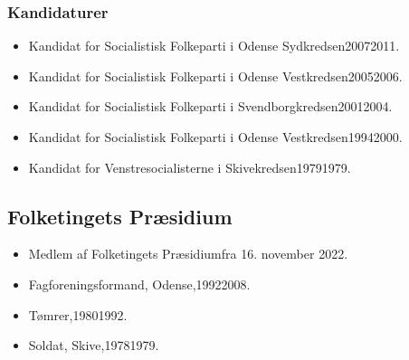 \documentclass[11pt, a4paper]{awesome-cv}
\begin{document}
\begin{cvletter}
\subsubsection*{Kandidaturer}
\begin{itemize}
\item Kandidat for Socialistisk Folkeparti i Odense Sydkredsen20072011.
\item Kandidat for Socialistisk Folkeparti i Odense Vestkredsen20052006.
\item Kandidat for Socialistisk Folkeparti i Svendborgkredsen20012004.
\item Kandidat for Socialistisk Folkeparti i Odense Vestkredsen19942000.
\item Kandidat for Venstresocialisterne i Skivekredsen19791979.
\end{itemize}
\subsection*{Folketingets Præsidium}
\begin{itemize}
\item Medlem af Folketingets Præsidiumfra 16. november 2022.
\end{itemize}
\begin{itemize}
\item Fagforeningsformand, Odense,19922008.
\item Tømrer,19801992.
\item Soldat, Skive,19781979.
\end{itemize}
\end{cvletter}
\end{document}
